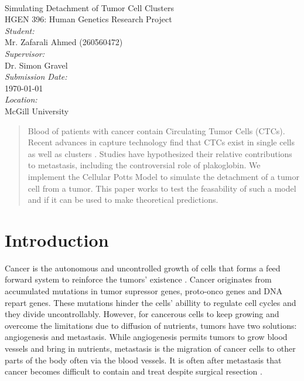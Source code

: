 \documentclass[12pt]{article}
\begin{document}
\begin{titlepage}
	\begin{center}
		~\\[2.5cm]
		{\Huge Simulating Detachment of Tumor Cell Clusters}\\[1.5cm]
		{\Large HGEN 396: Human Genetics Research Project}\\[7.0cm]
		\emph{Student:}\\
		Mr. Zafarali Ahmed (260560472)\\[1.0cm]
		\emph{Supervisor:}\\
		Dr. Simon Gravel\\[1.0cm]
		\emph{Submission Date:}\\
		\today\\[1.0cm]
		\emph{Location:}\\
		McGill University
	\end{center}
\end{titlepage}

\begin{abstract}
Blood of patients with cancer contain Circulating Tumor Cells (CTCs). Recent advances in capture technology find that CTCs exist in single cells as well as clusters \cite{Aceto2014}. Studies have hypothesized their relative contributions to metastasis, including the controversial role of plakoglobin. We implement the Cellular Potts Model to simulate the detachment of a tumor cell from a tumor. This paper works to test the feasability of such a model and if it can be used to make theoretical predictions.
\end{abstract}

\section{Introduction}
Cancer is the autonomous and uncontrolled growth of cells that forms a feed forward system to reinforce the tumors’ existence \cite{hallmarks}. Cancer originates from accumulated mutations in tumor supressor genes, proto-onco genes and DNA repart genes. These mutations hinder the cells' abillity to regulate cell cycles and they divide uncontrollably. However, for cancerous cells to keep growing and overcome the limitations due to diffusion of nutrients, tumors have two solutions: angiogenesis and metastasis. While angiogenesis permits tumors to grow blood vessels and bring in nutrients, metastasis is the migration of cancer cells to other parts of the body often via the blood vessels. It is often after metastasis that cancer becomes difficult to contain and treat despite surgical resection \cite{Hatzikirou2012}.
\end{document}
